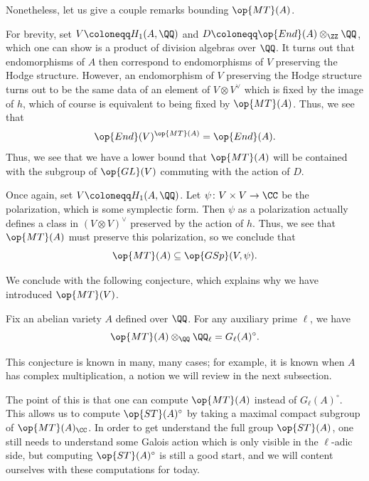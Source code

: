 \documentclass{article}
\begin{document}
Nonetheless, let us give a couple remarks bounding $\op{MT}(A)$.
\begin{remark} \label{rem:endo-mt-bound}
	For brevity, set $V\coloneqq H_1(A,\QQ)$ and $D\coloneqq\op{End}(A)\otimes_\ZZ\QQ$, which one can show is a product of division algebras over $\QQ$. It turns out that endomorphisms of $A$ then correspond to endomorphisms of $V$ preserving the Hodge structure. However, an endomorphism of $V$ preserving the Hodge structure turns out to be the same data of an element of $V\otimes V^\lor$ which is fixed by the image of $h$, which of course is equivalent to being fixed by $\op{MT}(A)$. Thus, we see that
	\[\op{End}(V)^{\op{MT}(A)}=\op{End}(A).\]
	Thus, we see that we have a lower bound that $\op{MT}(A)$ will be contained with the subgroup of $\op{GL}(V)$ commuting with the action of $D$.
\end{remark}
\begin{remark} \label{rem:polarization-mt-bound}
	Once again, set $V\coloneqq H_1(A,\QQ)$. Let $\psi\colon V\times V\to\CC$ be the polarization, which is some symplectic form. Then $\psi$ as a polarization actually defines a class in $(V\otimes V)^\lor$ preserved by the action of $h$. Thus, we see that $\op{MT}(A)$ must preserve this polarization, so we conclude that
	\[\op{MT}(A)\subseteq\op{GSp}(V,\psi).\]
\end{remark}
We conclude with the following conjecture, which explains why we have introduced $\op{MT}(V)$.
\begin{conj}
	Fix an abelian variety $A$ defined over $\QQ$. For any auxiliary prime $\ell$, we have
	\[\op{MT}(A)\otimes_\QQ\QQ_\ell=G_\ell(A)^\circ.\]
\end{conj}
\begin{remark}
	This conjecture is known in many, many cases; for example, it is known when $A$ has complex multiplication, a notion we will review in the next subsection.
\end{remark}
The point of this is that one can compute $\op{MT}(A)$ instead of $G_\ell(A)^\circ$. This allows us to compute $\op{ST}(A)^\circ$ by taking a maximal compact subgroup of $\op{MT}(A)_\CC$. In order to get understand the full group $\op{ST}(A)$, one still needs to understand some Galois action which is only visible in the $\ell$-adic side, but computing $\op{ST}(A)^\circ$ is still a good start, and we will content ourselves with these computations for today.
\end{document}
